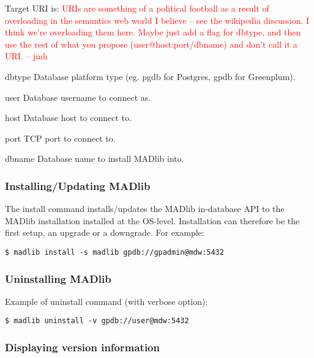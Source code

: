 \documentclass[11pt]{article}
\newcommand{\jmh}[1]{{\textcolor{red}{#1 -- jmh}}}
\begin{document}
{\begin{description}
	\item Target URI is:   \jmh{URIs are something of a political football as a result of overloading in the semantics web world I believe -- see the wikipedia discussion.  I think we're overloading them here.  Maybe just add a flag for dbtype, and then use the rest of what you propose (user@host:port/dbname) and don't call it a URI.}
	\begin{ttdescription}
		\item[dbtype] Database platform type (eg. pgdb for Postgres, gpdb for Greenplum). 
		\item[user] Database username to connect as.
		\item[host] Database host to connect to.
		\item[port] TCP port to connect to.
		\item[dbname] Database name to install MADlib into.
	\end{ttdescription}
	
\end{description}

	\subsubsection{Installing/Updating MADlib}

		The install command installs/updates the MADlib in-database API to the MADlib installation installed at the OS-level. Installation can therefore be the first setup, an upgrade or a downgrade. For example:

		\begin{lstlisting}
$ madlib install -s madlib gpdb://gpadmin@mdw:5432
		\end{lstlisting}

	\subsubsection{Uninstalling MADlib}

		Example of uninstall command (with verbose option):

		\begin{lstlisting}
$ madlib uninstall -v gpdb://user@mdw:5432
		\end{lstlisting}

	\subsubsection{Displaying version information}

}
\end{document}
